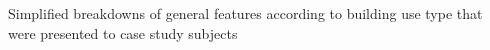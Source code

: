 Simplified breakdowns of general features according to building use type that were presented to case study subjects
\label{fig:buildingusebreakdownforcasestudies}